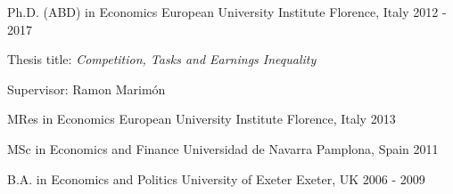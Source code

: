 

\begin{cventries}

  \cventry
    {Ph.D. (ABD) in Economics} %
    {European University Institute} %
    {Florence, Italy} %
    {2012 - 2017} %
    {
        \begin{cvitems} %
            \item {Thesis title: \textit{Competition, Tasks and Earnings Inequality}}
            \item {Supervisor: Ramon Marimón}
        \end{cvitems}
    }

\cventry
    {MRes in Economics} %
    {European University Institute} %
    {Florence, Italy} %
    {2013} %
    {}

\cventry
    {MSc in Economics and Finance} %
    {Universidad de Navarra} %
    {Pamplona, Spain} %
    {2011} %
    {}

\cventry
    {B.A. in Economics and Politics} %
    {University of Exeter} %
    {Exeter, UK} %
    {2006 - 2009} %
    {}

\end{cventries}


